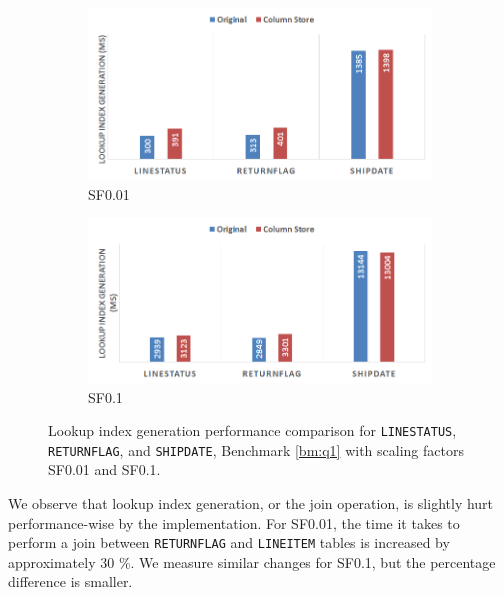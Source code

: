 \begin{figure}
    \centering
    \begin{subfigure}{0.9\textwidth}
        \includegraphics[width=\textwidth]{img/column-store-lig-sf001.png}
        \caption{SF0.01}
    \end{subfigure}
    \begin{subfigure}{0.9\textwidth}
        \includegraphics[width=\textwidth]{img/column-store-lig.png}
        \caption{SF0.1}
    \end{subfigure}
    \caption{Lookup index generation performance comparison for \texttt{LINESTATUS}, \texttt{RETURNFLAG}, and \texttt{SHIPDATE}, Benchmark \ref{bm:q1} with scaling factors SF0.01 and SF0.1.}
    \label{fig:column-store-lig}
\end{figure}
We observe that lookup index generation, or the join operation, is slightly hurt performance-wise by the  implementation. For SF0.01, the time it takes to perform a join between \texttt{RETURNFLAG} and \texttt{LINEITEM} tables is increased by approximately 30 \%. We measure similar changes for SF0.1, but the percentage difference is smaller.

